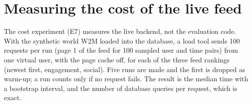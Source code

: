 \section{Measuring the cost of the live feed}
\label{sec:method-cost}

The cost experiment (E7) measures the live backend, not the evaluation code. With the synthetic world W2M loaded into the database, a load tool sends 100 requests per run (page 1 of the feed for 100 sampled user and time pairs) from one virtual user, with the page cache off, for each of the three feed rankings (newest first, engagement, social). Five runs are made and the first is dropped as warm-up; a run counts only if no request fails. The result is the median time with a bootstrap interval, and the number of database queries per request, which is exact.
